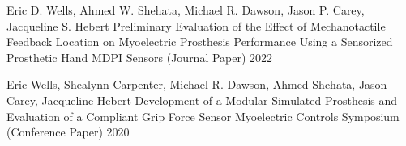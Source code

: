 
\begin{cventries}

  \cventry
    {Eric D. Wells, Ahmed W. Shehata, Michael R. Dawson, Jason P. Carey, Jacqueline S. Hebert} %
    {Preliminary Evaluation of the Effect of Mechanotactile Feedback Location on Myoelectric Prosthesis Performance Using a Sensorized Prosthetic Hand} %
    {MDPI Sensors (Journal Paper)} %
    {2022} %
    {}

  \cventry
    {Eric Wells, Shealynn Carpenter, Michael R. Dawson, Ahmed Shehata, Jason Carey, Jacqueline Hebert} %
    {Development of a Modular Simulated Prosthesis and Evaluation of a Compliant Grip Force Sensor} %
    {Myoelectric Controls Symposium (Conference Paper)} %
    {2020} %
    {}


\end{cventries}
